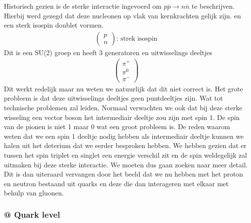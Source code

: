 \documentclass[../main.tex]{subfiles}
\begin{document}
Historisch gezien is de sterke interactie ingevoerd om $p\overline p \rightarrow n\overline n$ te beschrijven. Hierbij werd gezegd dat deze nucleonen op vlak van kernkrachten gelijk zijn. en een sterk isospin doublet vormen.
\begin{equation}
    \begin{aligned}
        \label{eq:nucleon_doublet}
        \begin{pmatrix}
            p\\
            n
        \end{pmatrix}
        \text{: strek isospin}
    \end{aligned}
\end{equation}
Dit is een SU(2) groep en heeft 3 generatoren en uitwisselings deeltjes
\begin{equation}
    \begin{aligned}
        \label{eq:isospin_uitwisseling_deeltjes}
        \begin{pmatrix}
            \pi^+\\
            \pi^0\\
            \pi^-
        \end{pmatrix}
    \end{aligned}
\end{equation}
Dit werkt redelijk maar nu weten we natuurlijk dat dit niet correct is. Het grote probleem is dat deze uitwisselings deeltjes geen puntdeeltjes zijn. Wat tot technische problemen zal leiden. Normaal verwachten we ook dat bij deze sterke wisseling een vector boson het intermediair deeltje zou zijn met spin 1. De spin van de pionen is niet 1 maar 0 wat een groot probleem is. De reden waarom weten dat we een spin 1 deeltje nodig hebben als intermediair deeltje kunnen we halen uit het deterium dat we eerder besproken hebben. We hebben gezien dat er tussen het spin triplet en singlet een energie verschil zit en de spin weldegelijk zal uitmaken bij deze sterke interactie. We moeten dus gaan zoeken naar meer detail. Dit is dan uiteraard vervangen door het beeld dat we nu hebben met het proton en neutron bestaand uit quarks en deze die dan interageren met elkaar met behulp van gluonen.

\subsubsection{@ Quark level}%
\label{ssub:_quark_level}
\end{document}
